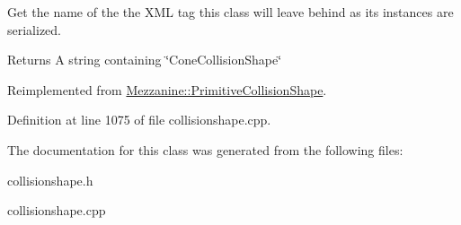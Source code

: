 Get the name of the the XML tag this class will leave behind as its instances are serialized. 

\begin{DoxyReturn}{Returns}
A string containing \char`\"{}ConeCollisionShape\char`\"{} 
\end{DoxyReturn}


Reimplemented from \hyperlink{classMezzanine_1_1PrimitiveCollisionShape_a19bb44a705ff86606834feb2783500e5}{Mezzanine::PrimitiveCollisionShape}.



Definition at line 1075 of file collisionshape.cpp.



The documentation for this class was generated from the following files:\begin{DoxyCompactItemize}
\item 
collisionshape.h\item 
collisionshape.cpp\end{DoxyCompactItemize}
